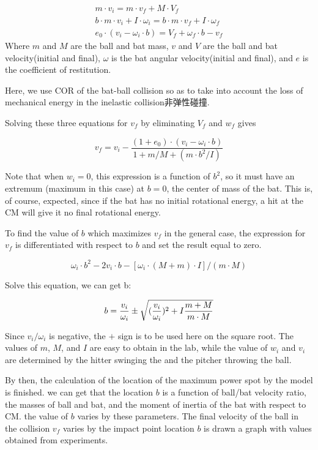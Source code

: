 \documentclass[12pt]{article}
\begin{document}
\begin{eqnarray}
m\cdot v_i=m\cdot v_f+M\cdot V_f \\
b\cdot m\cdot v_i+I\cdot \omega_i=b\cdot m\cdot v_f+I\cdot \omega_f\\
e_0\cdot (v_i-\omega_i\cdot b)=V_f+\omega_f\cdot b-v_f
\end{eqnarray}
Where $m$ and $M$ are the ball and bat mass,
$v$ and $V$ are the ball and bat velocity(initial and final),
$\omega$ is the bat angular velocity(initial and final),
and $e$ is the coefficient of restitution.

Here, we use COR of the bat-ball collision so as to take into account
the loss of mechanical energy in the inelastic collision{非弹性碰撞}.

Solving these three equations for $v_f$ by eliminating $V_f$ and $w_f$ gives

\begin{equation}
v_f=v_i-\frac{(1+e_0)\cdot(v_i-\omega_i\cdot b)}{1+m/M+(m\cdot b^2/I)}
\end{equation}

Note that when $w_i=0$, this expression is a function of $b^2$,
so it must have an extremum (maximum in this case) at $b=0$,
the center of mass of the bat.
This is, of course, expected, since if the bat has no initial rotational energy, a
hit at the CM will give it no final rotational energy.

To find the value of $b$ which maximizes $v_f$ in the general case, the
expression for $v_f$ is differentiated with respect to $b$
and set the result equal to zero.

\begin{equation}
\omega_i\cdot b^2-2v_i\cdot b-[\omega_i\cdot (M+m)\cdot I]/(m\cdot M)
\end{equation}

Solve this equation, we can get b:

\begin{equation}
b=\frac{v_i}{\omega_i}\pm \sqrt{(\frac{v_i}{\omega_i})^2+I\frac{m+M}{m\cdot M}}
\end{equation}

Since $v_i/\omega_i$ is negative,
the $+$ sign is to be used here on the square root.
The values of $m$, $M$, and $I$ are easy to obtain in the lab, while
the value of $w_i$ and $v_i$
are determined by the hitter swinging the
and the pitcher throwing the ball.

By then, the calculation of the location of
the maximum power spot by the model is finished. we
can get that the location $b$ is a function of ball/bat velocity ratio,
the masses of ball and bat, and
the moment of inertia of the bat with respect to CM.
the value of $b$ varies by these parameters.
The final velocity of the ball in the collision $v_f$
varies by the impact point location $b$
is drawn a graph with values obtained from experiments.
\end{document}
